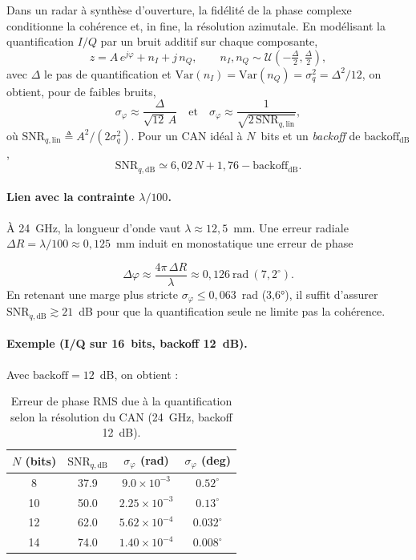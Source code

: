Dans un radar à synthèse d’ouverture, la fidélité de la phase complexe conditionne la cohérence et, in fine, la résolution azimutale. En modélisant la quantification $I/Q$ par un bruit additif sur chaque composante,
\[
z = A\,e^{j\varphi} + n_I + j\,n_Q,\qquad n_I,n_Q \sim \mathcal{U}\!\left(-\tfrac{\Delta}{2},\tfrac{\Delta}{2}\right),
\]
avec $\Delta$ le pas de quantification et $\mathrm{Var}(n_I)=\mathrm{Var}(n_Q)=\sigma_q^2=\Delta^2/12$, on obtient, pour de faibles bruits,
\[
\sigma_\varphi \approx \frac{\Delta}{\sqrt{12}\,A}
\quad\text{et}\quad
\sigma_\varphi \approx \frac{1}{\sqrt{2\,\mathrm{SNR}_{q,\mathrm{lin}}}},
\]
où $\mathrm{SNR}_{q,\mathrm{lin}} \triangleq A^2/(2\sigma_q^2)$. Pour un CAN idéal à $N$~bits et un \textit{backoff} de $\mathrm{backoff}_{\mathrm{dB}}$,
\begin{equation}
    \mathrm{SNR}_{q,\mathrm{dB}} \simeq 6{,}02\,N + 1{,}76 - \mathrm{backoff}_{\mathrm{dB}}.
\end{equation}



\paragraph{Lien avec la contrainte \texorpdfstring{$\lambda/100$}{lambda/100}.}
À 24~GHz, la longueur d’onde vaut $\lambda \approx 12{,}5$~mm. Une erreur radiale $\Delta R=\lambda/100 \approx 0{,}125$~mm induit en monostatique une erreur de phase


\begin{equation}
   \Delta\varphi \approx \frac{4\pi\,\Delta R}{\lambda} \approx 0{,}126~\text{rad}~(7{,}2^\circ). 
\end{equation}
En retenant une marge plus stricte $\sigma_\varphi \le 0{,}063$~rad (3{,}6°), il suffit d’assurer $\mathrm{SNR}_{q,\mathrm{dB}}\gtrsim 21$~dB pour que la quantification seule ne limite pas la cohérence.

\paragraph{Exemple (I/Q sur 16~bits, backoff 12~dB).}
Avec $\mathrm{backoff}=12$~dB, on obtient :
\begin{table}[H]
\centering
\label{tab:bits_phase_24ghz}
\renewcommand{\arraystretch}{1.1}
\begin{tabular}{@{}cccc@{}}
\toprule
$N$ (bits) & $\mathrm{SNR}_{q,\mathrm{dB}}$ & $\sigma_\varphi$ (rad) & $\sigma_\varphi$ (deg) \\
\midrule
8  & 37.9 & $9.0\times10^{-3}$  & $0.52^\circ$ \\
10 & 50.0 & $2.25\times10^{-3}$ & $0.13^\circ$ \\
12 & 62.0 & $5.62\times10^{-4}$ & $0.032^\circ$ \\
14 & 74.0 & $1.40\times10^{-4}$ & $0.008^\circ$ \\
\bottomrule
\end{tabular}
\caption{Erreur de phase RMS due à la quantification selon la résolution du CAN (24~GHz, backoff 12~dB).}
\end{table}

